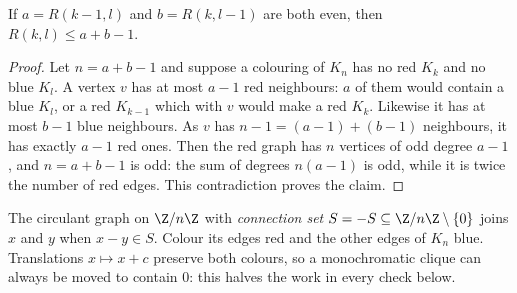 \begin{proposition}\label{prop:ramseyparity}
If $a=R(k-1,l)$ and $b=R(k,l-1)$ are both even, then $R(k,l)\le a+b-1$.
\end{proposition}
\begin{proof}
Let $n=a+b-1$ and suppose a colouring of $K_n$ has no red $K_k$ and no blue $K_l$. A vertex $v$ has at most $a-1$ red neighbours: $a$ of them would contain a
blue $K_l$, or a red $K_{k-1}$ which with $v$ would make a red $K_k$. Likewise it has at most $b-1$ blue neighbours. As $v$ has $n-1=(a-1)+(b-1)$ neighbours, it has
exactly $a-1$ red ones. Then the red graph has $n$ vertices of odd degree $a-1$, and $n=a+b-1$ is odd: the sum of degrees $n(a-1)$ is odd, while it is twice the number
of red edges. This contradiction proves the claim.
\end{proof}

The circulant graph on $\Z/n\Z$ with \emph{connection set} $S=-S\subseteq\Z/n\Z\setminus\{0\}$ joins $x$ and $y$ when $x-y\in S$. Colour its edges red and the other edges of $K_n$ blue.
Translations $x\mapsto x+c$ preserve both colours, so a monochromatic clique can always be moved to contain $0$: this halves the work in every check below.


